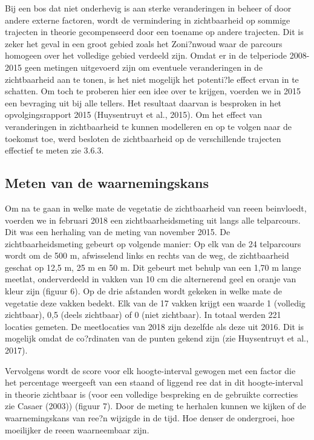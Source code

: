 \documentclass[twoside]{extreport}
\begin{document}
Bij een bos dat niet onderhevig is aan sterke veranderingen in beheer of
door andere externe factoren, wordt de vermindering in zichtbaarheid op
sommige trajecten in theorie gecompenseerd door een toename op andere
trajecten. Dit is zeker het geval in een groot gebied zoals het
Zoni?nwoud waar de parcours homogeen over het volledige gebied verdeeld
zijn. Omdat er in de telperiode 2008-2015 geen metingen uitgevoerd zijn
om eventuele veranderingen in de zichtbaarheid aan te tonen, is het niet
mogelijk het potenti?le effect ervan in te schatten. Om toch te proberen
hier een idee over te krijgen, voerden we in 2015 een bevraging uit bij
alle tellers. Het resultaat daarvan is besproken in het
opvolgingsrapport 2015 (Huysentruyt et al., 2015). Om het effect van
veranderingen in zichtbaarheid te kunnen modelleren en op te volgen naar
de toekomst toe, werd besloten de zichtbaarheid op de verschillende
trajecten effectief te meten zie 3.6.3.

\subsection{Meten van de
waarnemingskans}\label{meten-van-de-waarnemingskans}

Om na te gaan in welke mate de vegetatie de zichtbaarheid van reeen
beinvloedt, voerden we in februari 2018 een zichtbaarheidsmeting uit
langs alle telparcours. Dit was een herhaling van de meting van november
2015. De zichtbaarheidsmeting gebeurt op volgende manier: Op elk van de
24 telparcours wordt om de 500 m, afwisselend links en rechts van de
weg, de zichtbaarheid geschat op 12,5 m, 25 m en 50 m. Dit gebeurt met
behulp van een 1,70 m lange meetlat, onderverdeeld in vakken van 10 cm
die alternerend geel en oranje van kleur zijn (figuur 6). Op de drie
afstanden wordt gekeken in welke mate de vegetatie deze vakken bedekt.
Elk van de 17 vakken krijgt een waarde 1 (volledig zichtbaar), 0,5
(deels zichtbaar) of 0 (niet zichtbaar). In totaal werden 221 locaties
gemeten. De meetlocaties van 2018 zijn dezelfde als deze uit 2016. Dit
is mogelijk omdat de co?rdinaten van de punten gekend zijn (zie
Huysentruyt et al., 2017).

Vervolgens wordt de score voor elk hoogte-interval gewogen met een
factor die het percentage weergeeft van een staand of liggend ree dat in
dit hoogte-interval in theorie zichtbaar is (voor een volledige
bespreking en de gebruikte correcties zie Casaer (2003)) (figuur 7).
Door de meting te herhalen kunnen we kijken of de waarnemingskans van
ree?n wijzigde in de tijd. Hoe denser de ondergroei, hoe moeilijker de
reeen waarneembaar zijn.
\end{document}
